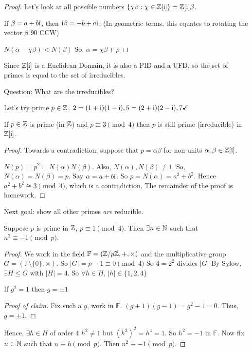 \documentclass[notes.tex]{subfiles}
\begin{document}
\begin{digression}
\begin{proof}
		Let's look at all possible numbers $\{\chi \beta : \chi\in\mathbb{Z}[\mathrm{i}]\} = \mathbb{Z}[\mathrm{i}]\beta$.

		If $\beta=a+b\mathrm{i}$, then $\mathrm{i} \beta = -b + a\mathrm{i}$. (In geometric terms, this equates to rotating the vector $\beta$ 90\textdegree\xspace CCW)

		$N(\alpha - \chi \beta)< N(\beta)$ So, $\alpha=\chi \beta+\rho$
	\end{proof}

	\begin{corollary}
		Since $\mathbb{Z}[\mathrm{i}]$ is a Euclidean Domain, it is also a PID and a UFD, so the set of primes is equal to the set of irreducibles.
	\end{corollary}
	Question: What are the irreducibles?

	Let's try prime $p\in\mathbb{Z}$.
	$2 = (1+\mathrm{i})(1-\mathrm{i}), 5 = (2+\mathrm{i})(2-\mathrm{i}), 7 \checkmark $ 

	\begin{proposition}
		If $p\in\mathbb{Z}$ is prime (in $\mathbb{Z}$) and $p\equiv 3\pmod4$ then $p$ is still prime (irreducible) in $\mathbb{Z}[\mathrm{i}]$.
	\end{proposition}
	\begin{proof}
		Towards a contradiction, suppose that $p=\alpha \beta$ for non-units $\alpha, \beta\in\mathbb{Z}[\mathrm{i}]$.

		$N(p) = p^2 = N(\alpha)N(\beta)$. Also, $N(\alpha), N(\beta)\ne 1$. So, $N(\alpha) = N(\beta) = p$. Say $\alpha = a+b\mathrm{i}$. So $p=N(\alpha)= a^2+b^2.$ Hence $a^2 +b^2\cong3\pmod4$, which is a contradiction. The remainder of the proof is homework.
	\end{proof}

	Next goal: show all other primes \emph{are} reducible.
	\begin{proposition}
		Suppose $p$ is prime in $\mathbb{Z}$, $p\equiv 1\pmod4$. Then $\exists n\in \mathbb{N}$ such that $n^2 \equiv -1\pmod p$.
	\end{proposition}
	\begin{proof}
		We work in the field $\mathbb F=(\mathbb{Z}/p\mathbb{Z}, +, \times)$ and the multiplicative group $G = (\mathbb F\setminus\{0\}, \times)$.
		So $|G| = p-1 \equiv 0\pmod4$ So $4=2^2$ divides $|G|$
		By Sylow, $\exists H\le G$ with $|H| = 4$. So $\forall h\in H$, $|h|\in\{1,2,4\}$
		\begin{claim}
			If $g^2 = 1$ then $g=\pm 1$
		\end{claim}
		\begin{proof}[Proof of claim]
			Fix such a $g$, work in $\mathbb F$.
			$(g+1)(g-1) = g^2 - 1 = 0$. Thus, $g=\pm 1$.
		\end{proof}
		Hence, $\exists h\in H$ of order 4 $h^2\ne 1$ but $(h^2)^2 = h^4 = 1$. So $h^2 = -1$ in $\mathbb F$. Now fix $n\in\mathbb{N}$ such that $n\equiv h\pmod p$. Then $n^2\equiv -1\pmod p$.
	\end{proof}


\end{digression}
\end{document}
